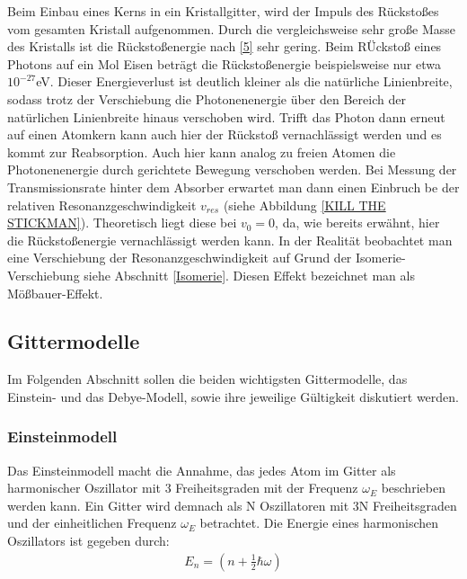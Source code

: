 {Beim Einbau eines Kerns in ein Kristallgitter, wird der Impuls des Rückstoßes vom gesamten Kristall aufgenommen. Durch die vergleichsweise sehr große Masse des Kristalls ist die Rückstoßenergie nach \ref{5} sehr gering. Beim RÜckstoß eines Photons auf ein Mol Eisen beträgt die Rückstoßenergie beispielsweise nur etwa $10^{-27}$eV. Dieser Energieverlust ist deutlich kleiner als die natürliche Linienbreite, sodass trotz der Verschiebung die Photonenenergie über den Bereich der natürlichen Linienbreite hinaus verschoben wird. Trifft das Photon dann erneut auf einen Atomkern kann auch hier der Rückstoß vernachlässigt werden und es kommt zur Reabsorption. 
Auch hier kann analog zu freien Atomen die Photonenenergie durch gerichtete Bewegung verschoben werden. Bei Messung der Transmissionsrate hinter dem Absorber erwartet man dann einen Einbruch be der relativen Resonanzgeschwindigkeit $v_{res}$ (siehe Abbildung \ref{KILL THE STICKMAN}). Theoretisch liegt diese bei $v_0=0$, da, wie bereits erwähnt, hier die Rückstoßenergie vernachlässigt werden kann. In der Realität beobachtet man eine Verschiebung der Resonanzgeschwindigkeit auf Grund der Isomerie-Verschiebung siehe Abschnitt \ref{Isomerie}.  
Diesen Effekt bezeichnet man als Mößbauer-Effekt.\cite{jakobs}


\subsection{Gittermodelle}

Im Folgenden Abschnitt sollen die beiden wichtigsten Gittermodelle, das Einstein- und das Debye-Modell, sowie ihre jeweilige Gültigkeit diskutiert werden.\cite{morris}

\subsubsection{Einsteinmodell}

Das Einsteinmodell macht die Annahme, das jedes Atom im Gitter als harmonischer Oszillator mit 3 Freiheitsgraden mit der Frequenz $\omega_E$ beschrieben werden kann. Ein Gitter wird demnach als N Oszillatoren mit 3N Freiheitsgraden und der einheitlichen Frequenz  $\omega_E$ betrachtet. Die Energie eines harmonischen Oszillators ist gegeben durch:
\begin{align}
E_n=\left( n+\frac{1}{2}\hbar\omega\right) 
\end{align} 

}
